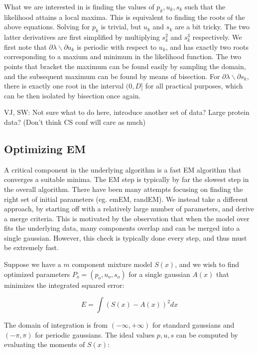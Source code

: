 \documentclass{acm_proc_article-sp}
\begin{document}
What we are interested in is finding the values of \textbf{$p_k, u_k, s_k$} such that the likelihood attains a local maxima. This is equivalent to finding the roots of the above equations. Solving for \(p_k\) is trivial, but \(u_k\) and \(s_k\) are a bit tricky.  The two latter derivatives are first simplified by multiplying \(s_k^2\) and \(s_k^3\) respectively. We first note that \(\partial \lambda \backslash \partial u_k \) is periodic with respect to \(u_k\), and has exactly two roots corresponding to a  maxium  and minimum in the likelihood function. The two points that bracket the maximum can be found easily by sampling the domain, and the subsequent maximum can be found by means of bisection. For \(\partial \lambda \backslash \partial s_k\), there is exactly one root in the interval \((0, D]\) for all practical purposes, which can be then isolated by bisection once again.

VJ, SW: Not sure what to do here, introduce another set of data? Large protein data? (Don't think CS conf will care as much)

\subsection{Optimizing EM}

A critical component in the underlying algorithm is a fast EM algorithm that converges a suitable minima. The EM step is typically by far the slowest step in the overall algorithm. There have been many attempts focusing on finding the right set of initial parameters (eg. emEM, randEM). We instead take a different approach, by starting off with a relatively large number of parameters, and derive a merge criteria. This is motivated by the observation that when the model over fits the underlying data, many components overlap and can be merged into a single gaussian. However, this check is typically done every step, and thus must be extremely fast.

Suppose we have a $m$ component mixture model $S(x)$, and we wish to find optimized parameters $P_o = (p_o, u_o, s_o)$ for a single gaussian $A(x)$ that minimizes the integrated squared error:

\begin{equation}
E = \int (S(x)-A(x))^2 dx
\end{equation}

The domain of integration is from $(-\infty,+\infty)$ for standard gaussians and $(-\pi, \pi)$ for periodic gaussians. The ideal values $p,u,s$ can be computed by evaluating the moments of $S(x)$:
\end{document}

